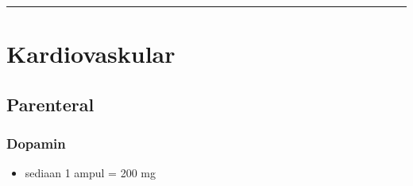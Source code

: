 \documentclass[
]{book}
\providecommand{\tightlist}{%
  \setlength{\itemsep}{0pt}\setlength{\parskip}{0pt}}
\begin{document}
\begin{center}\rule{0.5\linewidth}{0.5pt}\end{center}

\hypertarget{kardiovaskular-3}{%
\section{Kardiovaskular}\label{kardiovaskular-3}}

\hypertarget{parenteral-2}{%
\subsection{Parenteral}\label{parenteral-2}}

\hypertarget{dopamin}{%
\subsubsection{Dopamin}\label{dopamin}}

\begin{itemize}
\tightlist
\item
  sediaan 1 ampul = 200 mg
\end{itemize}
\end{document}
